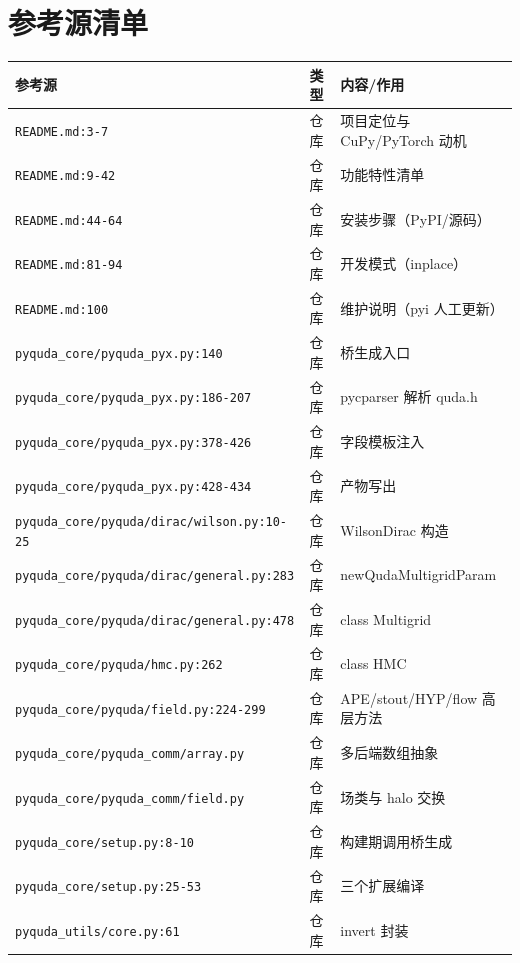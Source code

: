 \documentclass[UTF8]{ctexart}
\begin{document}
\section{参考源清单}
\begin{xltabular}{\textwidth}{lXX}
\toprule
\textcolor{evidence}{参考源} & 类型 & 内容/作用 \\
\midrule
\endhead
\texttt{\nolinkurl{README.md:3-7}} & 仓库 & 项目定位与 CuPy/PyTorch 动机 \\
\texttt{\nolinkurl{README.md:9-42}} & 仓库 & 功能特性清单 \\
\texttt{\nolinkurl{README.md:44-64}} & 仓库 & 安装步骤（PyPI/源码）\\
\texttt{\nolinkurl{README.md:81-94}} & 仓库 & 开发模式（inplace）\\
\texttt{\nolinkurl{README.md:100}} & 仓库 & 维护说明（pyi 人工更新）\\
\texttt{\nolinkurl{pyquda_core/pyquda_pyx.py:140}} & 仓库 & 桥生成入口 \\
\texttt{\nolinkurl{pyquda_core/pyquda_pyx.py:186-207}} & 仓库 & pycparser 解析 quda.h \\
\texttt{\nolinkurl{pyquda_core/pyquda_pyx.py:378-426}} & 仓库 & 字段模板注入 \\
\texttt{\nolinkurl{pyquda_core/pyquda_pyx.py:428-434}} & 仓库 & 产物写出 \\
\texttt{\nolinkurl{pyquda_core/pyquda/dirac/wilson.py:10-25}} & 仓库 & WilsonDirac 构造 \\
\texttt{\nolinkurl{pyquda_core/pyquda/dirac/general.py:283}} & 仓库 & newQudaMultigridParam \\
\texttt{\nolinkurl{pyquda_core/pyquda/dirac/general.py:478}} & 仓库 & class Multigrid \\
\texttt{\nolinkurl{pyquda_core/pyquda/hmc.py:262}} & 仓库 & class HMC \\
\texttt{\nolinkurl{pyquda_core/pyquda/field.py:224-299}} & 仓库 & APE/stout/HYP/flow 高层方法 \\
\texttt{\nolinkurl{pyquda_core/pyquda_comm/array.py}} & 仓库 & 多后端数组抽象 \\
\texttt{\nolinkurl{pyquda_core/pyquda_comm/field.py}} & 仓库 & 场类与 halo 交换 \\
\texttt{\nolinkurl{pyquda_core/setup.py:8-10}} & 仓库 & 构建期调用桥生成 \\
\texttt{\nolinkurl{pyquda_core/setup.py:25-53}} & 仓库 & 三个扩展编译 \\
\texttt{\nolinkurl{pyquda_utils/core.py:61}} & 仓库 & invert 封装 \\

\end{xltabular}
\end{document}
